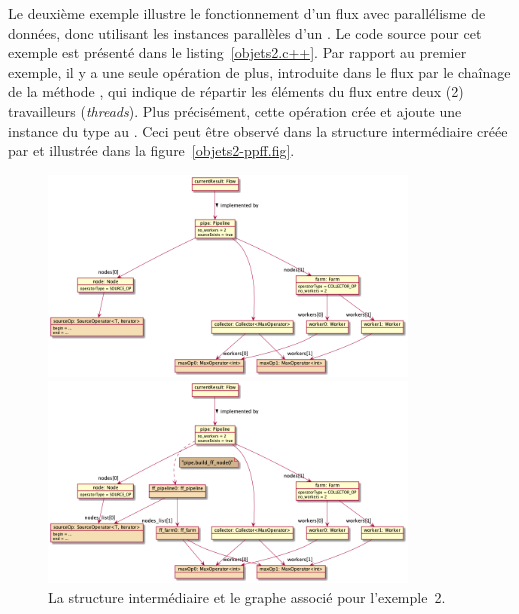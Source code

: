 Le deuxi\`eme exemple illustre le fonctionnement d'un flux avec parallélisme de données, donc utilisant les instances parall\`eles d'un . Le code source pour cet exemple est présenté dans le listing~\ref{objets2.c++}. Par rapport au premier exemple, il y a une seule op\'eration de plus, introduite dans le flux par le cha\^inage de la m\'ethode , qui indique de r\'epartir les \'el\'ements du flux entre deux (2) travailleurs (\emph{threads}). Plus précisément, cette op\'eration cr\'ee et ajoute une instance du type  au . Ceci peut \^etre observ\'e dans la structure interm\'ediaire cr\'e\'ee par  et illustr\'ee dans la figure~\ref{objets2-ppff.fig}.


\begin{figure}
\centering
         \includegraphics[width=0.85\textwidth]{Figures/objets2-ppff.png}
      \caption[La structure interm\'ediaire  pour l'exemple~2.]{La structure interm\'ediaire  pour 
         l'exemple~2~:.}
       \label{objets2-ppff.fig}

\centering
         \includegraphics[width=0.85\textwidth]{Figures/objets2-ff.png}
      \caption{La structure interm\'ediaire  et le graphe  associ\'e pour l'exemple~2.}
       \label{objets2-ff.fig}

\end{figure}




